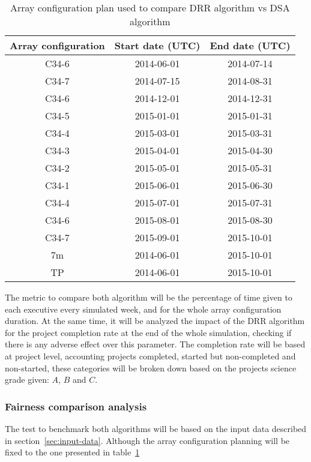\begin{table}[b]
\begin{center}
\begin{tabular}{|c|c|c|}
\hline
Array configuration & Start date (UTC) & End date (UTC) \\ \hline
C34-6 & 2014-06-01 & 2014-07-14 \\ \hline
C34-7 & 2014-07-15 & 2014-08-31 \\ \hline
C34-6 & 2014-12-01 & 2014-12-31 \\ \hline
C34-5 & 2015-01-01 & 2015-01-31 \\ \hline
C34-4 & 2015-03-01 & 2015-03-31 \\ \hline
C34-3 & 2015-04-01 & 2015-04-30 \\ \hline
C34-2 & 2015-05-01 & 2015-05-31 \\ \hline
C34-1 & 2015-06-01 & 2015-06-30 \\ \hline
C34-4 & 2015-07-01 & 2015-07-31 \\ \hline
C34-6 & 2015-08-01 & 2015-08-30 \\ \hline
C34-7 & 2015-09-01 & 2015-10-01 \\ \hline
7m & 2014-06-01 & 2015-10-01 \\ \hline
TP & 2014-06-01 & 2015-10-01 \\ \hline
\end{tabular}
\end{center}
\caption{Array configuration plan used to compare DRR algorithm vs DSA algorithm}
\label{table:drr-test-array-config}
\end{table}

The metric to compare both algorithm will be the percentage of time given to each executive every simulated week, and for the whole array configuration duration. At the same time, it will be analyzed the impact of the DRR algorithm for the project completion rate at the end of the whole simulation, checking if there is any adverse effect over this parameter. The completion rate will be based at project level, accounting projects completed, started but non-completed and non-started, these categories will be broken down based on the projects science grade given: $A$, $B$ and $C$.

\subsubsection{Fairness comparison analysis}
The test to benchmark both algorithms will be based on the input data described in section~\ref{sec:input-data}. Although the array configuration planning will be fixed to the one presented in table~\ref{table:drr-test-array-config}

